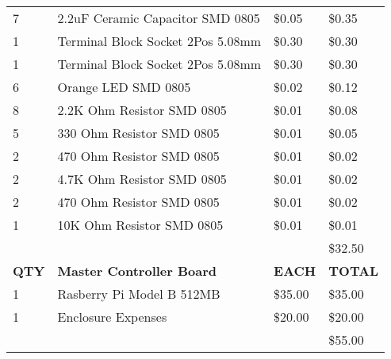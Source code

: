 \begin{table}[h]
{\begin{tabular}{llll}
7            & 2.2uF Ceramic Capacitor SMD 0805                     & \$0.05        & \$0.35         \\
1            & Terminal Block Socket 2Pos 5.08mm                    & \$0.30        & \$0.30         \\
1            & Terminal Block Socket 2Pos 5.08mm                    & \$0.30        & \$0.30         \\
6            & Orange LED SMD 0805                                  & \$0.02        & \$0.12         \\
8            & 2.2K Ohm Resistor SMD 0805                           & \$0.01        & \$0.08         \\
5            & 330 Ohm Resistor SMD 0805                            & \$0.01        & \$0.05         \\
2            & 470 Ohm Resistor SMD 0805                            & \$0.01        & \$0.02         \\
2            & 4.7K Ohm Resistor SMD 0805                           & \$0.01        & \$0.02         \\
2            & 470 Ohm Resistor SMD 0805                            & \$0.01        & \$0.02         \\
1            & 10K Ohm Resistor SMD 0805                            & \$0.01        & \$0.01         \\
             &                                                      &               & \$32.50        \\  \hline \hline
\textbf{QTY} & \textbf{Master Controller Board}                     & \textbf{EACH} & \textbf{TOTAL} \\
1            & Rasberry Pi Model B 512MB                            & \$35.00       & \$35.00        \\
1            & Enclosure Expenses                                   & \$20.00       & \$20.00        \\
             &                                                      &               & \$55.00        \\  \hline
\end{tabular}}
\end{table}
